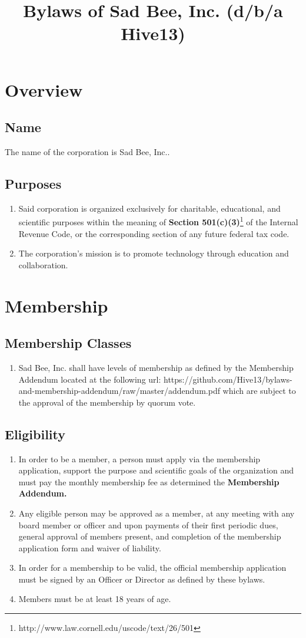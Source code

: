 \documentclass{article}
\title{Bylaws of Sad Bee, Inc. (d/b/a Hive13)}
\begin{document}
\maketitle
\section{Overview}
\subsection{Name}
The name of the corporation is Sad Bee, Inc..
\subsection{Purposes}
\begin{enumerate}
    \item Said corporation is organized exclusively for charitable, educational,
and scientific purposes within the meaning of \textbf{Section 501(c)(3)}\footnote{http://www.law.cornell.edu/uscode/text/26/501} of the Internal
Revenue Code, or the corresponding section of any future federal tax code.
    \item The corporation's mission is to promote technology through education and 
collaboration.
\end{enumerate}
\section{Membership}
\subsection{Membership Classes}
\begin{enumerate}
    \item Sad Bee, Inc. shall have levels of membership as defined by the
    Membership Addendum located at the following url: https://github.com/Hive13/bylaws-and-membership-addendum/raw/master/addendum.pdf which are
    subject to the approval of the membership by quorum vote.
\end{enumerate}
\subsection{Eligibility}
\begin{enumerate}
    \item In order to be a member, a person must apply via the membership
    application, support the purpose and scientific goals of the organization
    and must pay the monthly membership fee as determined the \textbf{Membership Addendum.}
    \item Any eligible person may be approved as a member, at any meeting with
    any board member or officer and upon payments of their first periodic dues,
    general approval of members present, and completion of the membership
    application form and waiver of liability.
    \item In order for a membership to be valid, the official membership
    application must be signed by an Officer or Director as defined by these
    bylaws.
    \item Members must be at least 18 years of age.
\end{enumerate}
\end{document}
